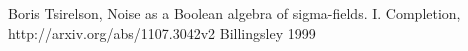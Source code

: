 \begin{thebibliography}{99}
 Boris Tsirelson, Noise as a Boolean
  algebra of sigma-fields. I. Completion, http://arxiv.org/abs/1107.3042v2
 Billingsley 1999
\end{thebibliography}
